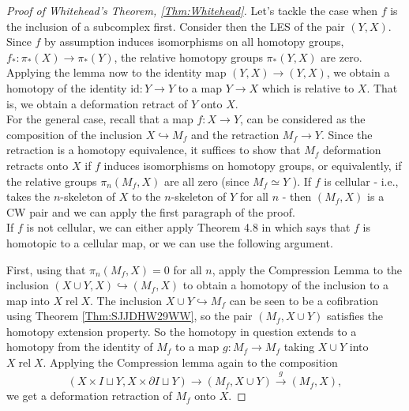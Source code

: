 \documentclass[reqno]{amsart}
\theoremstyle{definition}
\theoremstyle{remark}
\DeclareMathOperator{\rel}{rel}
\newcommand{\id}{{\mathrm{id}}}
\begin{document}
\begin{proof}[Proof of Whitehead's Theorem, \ref{Thm:Whitehead}]
    Let's tackle the case when $f$ is the inclusion
    of a subcomplex first. Consider then
    the LES of the pair $\left( Y,X \right) $. Since
    $f$ by assumption induces isomorphisms
    on all homotopy groups,
    $f_* \colon \pi_* (X) \to \pi_* (Y)$, the
    relative homotopy groups
    $\pi_* (Y,X)$ are zero. Applying the lemma now
    to the identity map $\left( Y,X \right) \to 
    \left( Y,X \right) $, we obtain a homotopy
    of the identity  $\id \colon Y \to Y$ to
    a map $Y \to X$ which is relative to
    $X$. That is, we obtain a deformation retract of
    $Y$ onto $X$.\\
    \linebreak
    For the general case, recall that
    a map $f \colon X \to Y$, can be considered
    as the composition of the
    inclusion $X \hookrightarrow M_f$ and the
    retraction $M_f \to Y$. Since
    the retraction is a homotopy equivalence,
    it suffices to show that $M_f$ deformation retracts
    onto $X$ if $f$ induces isomorphisms on homotopy
    groups, or equivalently, if the relative groups
    $\pi_n \left( M_f, X \right) $ are all zero (since
    $M_f \simeq Y$ ).
    If $f$ is cellular - i.e., takes the $n$-skeleton of
    $X$ to the $n$-skeleton of $Y$ for all
    $n$ - then $\left( M_f, X \right) $ is a CW pair and
    we can apply the first paragraph of the proof.\\
    If $f$ is not cellular, we can either apply
    Theorem 4.8 in \cite{Hatcher} which says
    that $f$ is homotopic to a cellular map, or we can use
    the following argument.

    First, using that 
    $\pi_n \left( M_f, X \right) = 0$ for all $n$, 
    apply the Compression Lemma to
    the inclusion $ \left( X \cup  Y, X \right) 
    \hookrightarrow \left( M_f, X \right) $ to
    obtain a homotopy of the
    inclusion to a map into $X \rel X$.
    The inclusion $X \cup Y \hookrightarrow M_f$ can be
    seen to be a cofibration using 
    Theorem \ref{Thm:SJJDHW29WW}, so
    the pair $\left( M_f, X \cup Y \right) $ satisfies the
    homotopy extension property. So the
    homotopy in question extends to a homotopy
    from the identity of $M_f$ to a
    map $g \colon M_f \to M_f$ taking 
    $X \cup Y$ into $X \rel X$. Applying the
    Compression lemma again to the
    composition
     \[
         \left( X \times I \sqcup Y,
         X \times \partial I \sqcup Y\right) 
         \to \left( M_f, X \cup Y \right) 
         \stackrel{g}{\to} \left( M_f,X \right) ,
    \]
    we get a deformation retraction of
    $M_f$ onto $X$.
\end{proof}





\newpage

\printbibliography
\end{document}

